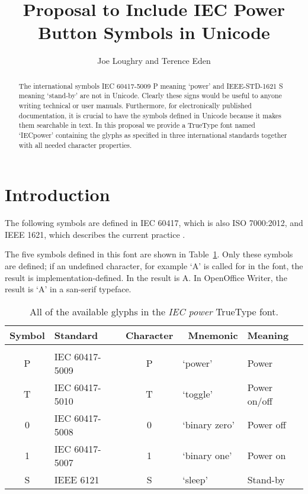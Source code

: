 \documentclass[10pt,letterpaper]{article}
\newcommand{\IEC}[1]{{\fontspec{IECpower}#1}}
\begin{document}
\title{Proposal to Include IEC Power Button Symbols in Unicode}

\author{Joe Loughry and Terence Eden}

\maketitle

\begin{abstract}
The international symbols IEC 60417-5009 \IEC{P} meaning `power' and
IEEE-STD-1621 \IEC{S} meaning `stand-by' are not in Unicode.  Clearly
these signs would be useful to anyone writing technical or user manuals.
Furthermore, for electronically published documentation, it is crucial
to have the symbols defined in Unicode because it makes them searchable
in text.  In this proposal we provide a TrueType font named `IECpower'
containing the glyphs as specified in three international standards
together with all needed character properties.
\end{abstract}

\section{Introduction}

The following symbols are defined in IEC 60417, which is also ISO 7000:2012,
and IEEE 1621, which describes the current practice
\cite{IEEE1621,ISO7000,IEC60417}.

The five symbols defined in this font are shown in Table~\ref{table:symbols}.
Only these symbols are defined; if an undefined character, for example `A' is
called for in the font, the result is implementation-defined. In 
the result is \IEC{A}. In OpenOffice Writer, the result is `A' in a san-serif
typeface.

\begin{table}[htbp]
	\centering
	\begin{tabular}{clcll}
		\textbf{Symbol} & \textbf{Standard} & \textbf{Character} & \
			\textbf{Mnemonic} & \textbf{Meaning} \\
		\hline \\
		\IEC{P} & IEC 60417-5009 & P & `power'       & Power        \\
		\IEC{T} & IEC 60417-5010 & T & `toggle'      & Power on/off \\
		\IEC{0} & IEC 60417-5008 & 0 & `binary zero' & Power off    \\
		\IEC{1} & IEC 60417-5007 & 1 & `binary one'  & Power on     \\
		\IEC{S} & IEEE 6121      & S & `sleep'       & Stand-by     \\
    \end{tabular}
    \caption{All of the available glyphs in the \emph{IEC power} TrueType font.}
    \label{table:symbols} %
\end{table}
\end{document}
